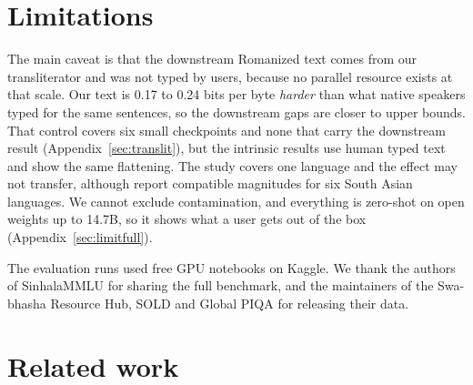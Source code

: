 \documentclass{article}
\begin{document}
\section{Limitations}
\label{sec:limitations}

The main caveat is that the downstream Romanized text comes from our transliterator and was
not typed by users, because no parallel resource exists at that scale. Our text is 0.17 to 0.24 bits
per byte \emph{harder} than what native speakers typed for the same sentences, so the
downstream gaps are closer to upper bounds. That control covers six small checkpoints and
none that carry the downstream result (Appendix~\ref{sec:translit}), but the intrinsic
results use human typed text and show the same flattening. The study covers one language and the effect may not transfer, although
\citet{khullar-etal-2025-scriptgap} report compatible magnitudes for six South Asian
languages. We cannot exclude contamination, and everything is zero-shot on open weights up
to 14.7B, so it shows what a user gets out of the box (Appendix~\ref{sec:limitfull}).

\begin{ack}
The evaluation runs used free GPU notebooks on Kaggle. We thank the authors of
SinhalaMMLU for sharing the full benchmark, and the maintainers of the Swa-bhasha Resource
Hub, SOLD and Global PIQA for releasing their data.
\end{ack}

\label{sec:endofmain}




\newpage
\appendix

\section{Related work}
\label{sec:related}
\end{document}
